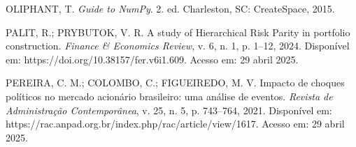 \begin{thebibliography}{99}
OLIPHANT, T. \textit{Guide to NumPy}. 2. ed. Charleston, SC: CreateSpace, 2015.

PALIT, R.; PRYBUTOK, V. R. A study of Hierarchical Risk Parity in portfolio construction. \textit{Finance \& Economics Review}, v. 6, n. 1, p. 1--12, 2024. Disponível em: https://doi.org/10.38157/fer.v6i1.609. Acesso em: 29 abril 2025.

PEREIRA, C. M.; COLOMBO, C.; FIGUEIREDO, M. V. Impacto de choques políticos no mercado acionário brasileiro: uma análise de eventos. \textit{Revista de Administração Contemporânea}, v. 25, n. 5, p. 743--764, 2021. Disponível em: https://rac.anpad.org.br/index.php/rac/article/view/1617. Acesso em: 29 abril 2025.

\end{thebibliography}